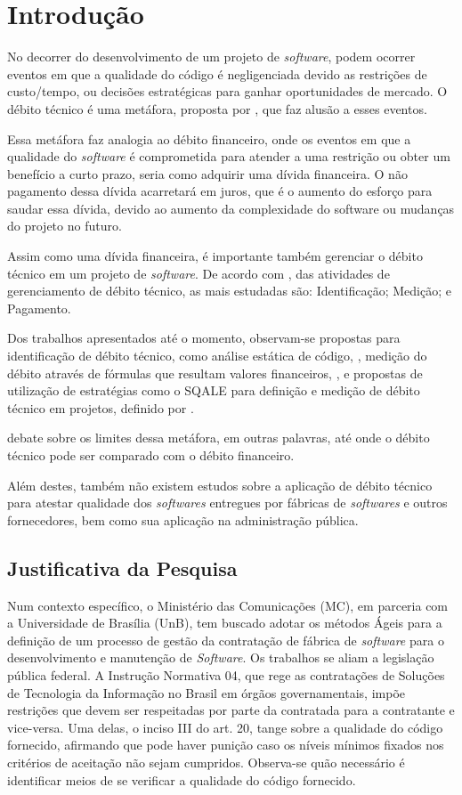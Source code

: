 \chapter[Introdução]{Introdução}

No decorrer do desenvolvimento de um projeto de \textit{software}, podem ocorrer eventos
em que a qualidade do código é negligenciada devido as restrições de custo/tempo,
ou decisões estratégicas para ganhar oportunidades de mercado. O débito técnico
é uma metáfora, proposta por \cite{cunningham}, que faz alusão a esses eventos.

Essa metáfora faz analogia ao débito financeiro, onde os eventos em que a
qualidade do \textit{software} é comprometida para atender a uma restrição ou obter
um benefício a curto prazo, seria como adquirir uma dívida financeira. O não
pagamento dessa dívida acarretará em juros, que é o aumento do esforço para
saudar essa dívida, devido ao aumento da complexidade do software ou mudanças
do projeto no futuro.

Assim como uma dívida financeira, é importante também gerenciar o débito técnico
em um projeto de \textit{software}. De acordo com \cite{mapping}, das atividades de
gerenciamento de débito técnico, as mais estudadas são: Identificação; Medição;
e Pagamento.

Dos trabalhos apresentados até o momento, observam-se propostas para identificação de
débito técnico, como análise estática de código, \cite{siebra}, medição do débito
através de fórmulas que resultam valores financeiros, \cite{principal}, e
propostas de utilização de estratégias como o SQALE para definição e medição de
débito técnico em projetos, definido por \cite{letouzey}.

\cite{schmid} debate sobre os limites dessa metáfora, em outras palavras, até onde
o débito técnico pode ser comparado com o débito financeiro.

Além destes, também não existem estudos sobre a aplicação de débito técnico para
atestar qualidade dos \textit{softwares} entregues por fábricas de \textit{softwares} e outros
fornecedores, bem como sua aplicação na administração pública.


\section{Justificativa da Pesquisa}
Num contexto específico, o Ministério das Comunicações (MC), em parceria com a
Universidade de Brasília (UnB), tem buscado adotar os métodos Ágeis para a
definição de um processo de gestão da contratação de fábrica de \textit{software} para o
desenvolvimento e manutenção de \textit{Software}.
Os trabalhos se aliam a legislação pública federal. A Instrução Normativa 04,
que rege as contratações de Soluções de Tecnologia da Informação no
 Brasil em órgãos governamentais, impõe restrições que devem ser respeitadas por
 parte da contratada para a contratante e vice-versa. Uma delas, o inciso III do
 art. 20, tange sobre a qualidade do código fornecido, afirmando que pode haver
 punição caso os níveis mínimos fixados nos critérios de aceitação não sejam
 cumpridos. Observa-se quão necessário é identificar meios de se verificar a
 qualidade do código fornecido.

